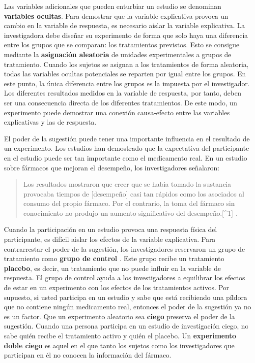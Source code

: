 \documentclass[
  letterpaper,
  DIV=11,
  numbers=noendperiod,
  oneside]{scrreprt}
\begin{document}
Las variables adicionales que pueden enturbiar un estudio se denominan
\textbf{variables ocultas}. Para demostrar que la variable explicativa
provoca un cambio en la variable de respuesta, es necesario aislar la
variable explicativa. La investigadora debe diseñar su experimento de
forma que solo haya una diferencia entre los grupos que se comparan: los
tratamientos previstos. Esto se consigue mediante la \textbf{asignación
aleatoria} de unidades experimentales a grupos de tratamiento. Cuando
los sujetos se asignan a los tratamientos de forma aleatoria, todas las
variables ocultas potenciales se reparten por igual entre los grupos. En
este punto, la única diferencia entre los grupos es la impuesta por el
investigador. Los diferentes resultados medidos en la variable de
respuesta, por tanto, deben ser una consecuencia directa de los
diferentes tratamientos. De este modo, un experimento puede demostrar
una conexión causa-efecto entre las variables explicativas y las de
respuesta.

El poder de la sugestión puede tener una importante influencia en el
resultado de un experimento. Los estudios han demostrado que la
expectativa del participante en el estudio puede ser tan importante como
el medicamento real. En un estudio sobre fármacos que mejoran el
desempeño, los investigadores señalaron:

\begin{quote}
Los resultados mostraron que creer que se había tomado la sustancia
provocaba tiempos de {[}desempeño{]} casi tan rápidos como los asociados
al consumo del propio fármaco. Por el contrario, la toma del fármaco sin
conocimiento no produjo un aumento significativo del
desempeño.{[}\^{}1{]} .
\end{quote}

Cuando la participación en un estudio provoca una respuesta física del
participante, es difícil aislar los efectos de la variable explicativa.
Para contrarrestar el poder de la sugestión, los investigadores
reservaron un grupo de tratamiento como \textbf{grupo de control} . Este
grupo recibe un tratamiento \textbf{placebo}, es decir, un tratamiento
que no puede influir en la variable de respuesta. El grupo de control
ayuda a los investigadores a equilibrar los efectos de estar en un
experimento con los efectos de los tratamientos activos. Por supuesto,
si usted participa en un estudio y sabe que está recibiendo una píldora
que no contiene ningún medicamento real, entonces el poder de la
sugestión ya no es un factor. Que un experimento aleatorio sea
\textbf{ciego} preserva el poder de la sugestión. Cuando una persona
participa en un estudio de investigación ciego, no sabe quién recibe el
tratamiento activo y quién el placebo. Un \textbf{experimento doble
ciego} es aquel en el que tanto los sujetos como los investigadores que
participan en él no conocen la información del fármaco.
\end{document}
